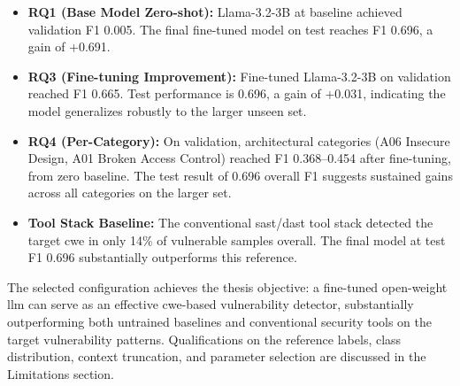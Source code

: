 \begin{itemize}
  \item \textbf{RQ1 (Base Model Zero-shot):} Llama-3.2-3B at baseline achieved validation F1 0.005. The final fine-tuned model on test reaches F1 0.696, a gain of +0.691.
  \item \textbf{RQ3 (Fine-tuning Improvement):} Fine-tuned Llama-3.2-3B on validation reached F1 0.665. Test performance is 0.696, a gain of +0.031, indicating the model generalizes robustly to the larger unseen set.
  \item \textbf{RQ4 (Per-Category):} On validation, architectural categories (A06 Insecure Design, A01 Broken Access Control) reached F1 0.368--0.454 after fine-tuning, from zero baseline. The test result of 0.696 overall F1 suggests sustained gains across all categories on the larger set.
  \item \textbf{Tool Stack Baseline:} The conventional \gls{sast}/\gls{dast} tool stack detected the target \gls{cwe} in only 14\% of vulnerable samples overall. The final model at test F1 0.696 substantially outperforms this reference.
\end{itemize}

The selected configuration achieves the thesis objective: a fine-tuned open-weight \gls{llm} can serve as an effective \gls{cwe}-based vulnerability detector, substantially outperforming both untrained baselines and conventional security tools on the target vulnerability patterns. Qualifications on the reference labels, class distribution, context truncation, and parameter selection are discussed in the Limitations section.
